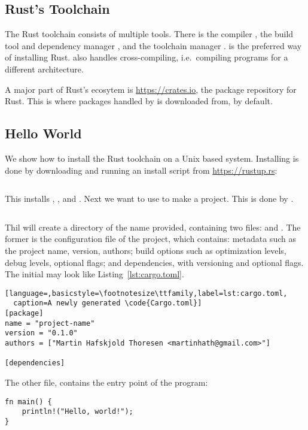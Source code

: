 \documentclass[b5paper,twoside]{report}
\begin{document}
\begin{appendices}
  \chapter{Rust's Toolchain}
  The Rust toolchain consists of multiple tools.
  There is the compiler \rustc{}, the build tool and dependency manager \cargo{},
  and the toolchain manager \rustup.
  \rustup{} is the preferred way of installing Rust.
  \rustup{} also handles cross-compiling, i.e.\ compiling programs for a different
  architecture.

  A major part of Rust's ecosytem is \url{https://crates.io}, the package repository
  for Rust. This is where packages handled by \cargo{} is downloaded from, by default.

  \section*{Hello World}
  We show how to install the Rust toolchain on a Unix based system.
  Installing \rustup{} is done by downloading and running an install script from
  \url{https://rustup.rs}:
  \begin{lstlisting}[language=Bash,numbers=none]
% curl https://sh.rustup.rs -sSf | sh
  \end{lstlisting}
  This installs \rustup{}, \cargo{}, and \rustc{}.
  Next we want to use \cargo{} to make a project. This is done by .
  \begin{lstlisting}[language=Bash,numbers=none]
% cargo init --bin <name-of-project>
  \end{lstlisting}
  Thil will create a directory of the name provided, containing two files:
   and .
  The former is the configuration file of the project, which contains:
  metadata such as the project name, version, authors;
  build options such as optimization levels, debug levels, optional flags;
  and dependencies, with versioning and optional flags.
  The initial  may look like Listing~\ref{lst:cargo.toml}.
  \begin{lstlisting}[language=,basicstyle=\footnotesize\ttfamily,label=lst:cargo.toml,
  caption=A newly generated \code{Cargo.toml}]
[package]
name = "project-name"
version = "0.1.0"
authors = ["Martin Hafskjold Thoresen <martinhath@gmail.com>"]

[dependencies]
  \end{lstlisting}
  The other file,  contains the entry point of the program:
  \begin{lstlisting}
fn main() {
    println!("Hello, world!");
}
  \end{lstlisting}


\end{appendices}
\end{document}
